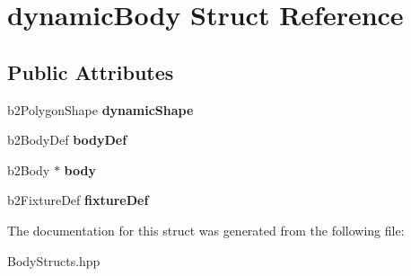 \hypertarget{structdynamic_body}{\section{dynamic\-Body Struct Reference}
\label{structdynamic_body}
}
\subsection*{Public Attributes}
\begin{DoxyCompactItemize}
\item 
\hypertarget{structdynamic_body_ae8e99ba778d0b451a0fcde9618ccd701}{b2\-Polygon\-Shape {\bfseries dynamic\-Shape}}\label{structdynamic_body_ae8e99ba778d0b451a0fcde9618ccd701}

\item 
\hypertarget{structdynamic_body_a7462e596fac525f60295fd8ad4bf7112}{b2\-Body\-Def {\bfseries body\-Def}}\label{structdynamic_body_a7462e596fac525f60295fd8ad4bf7112}

\item 
\hypertarget{structdynamic_body_a4d3f717a8113be7c019c14fd5e90d181}{b2\-Body $\ast$ {\bfseries body}}\label{structdynamic_body_a4d3f717a8113be7c019c14fd5e90d181}

\item 
\hypertarget{structdynamic_body_ae8cfdf22a1cf26cab93118d0f1ba30bf}{b2\-Fixture\-Def {\bfseries fixture\-Def}}\label{structdynamic_body_ae8cfdf22a1cf26cab93118d0f1ba30bf}

\end{DoxyCompactItemize}


The documentation for this struct was generated from the following file\-:\begin{DoxyCompactItemize}
\item 
Body\-Structs.\-hpp\end{DoxyCompactItemize}
